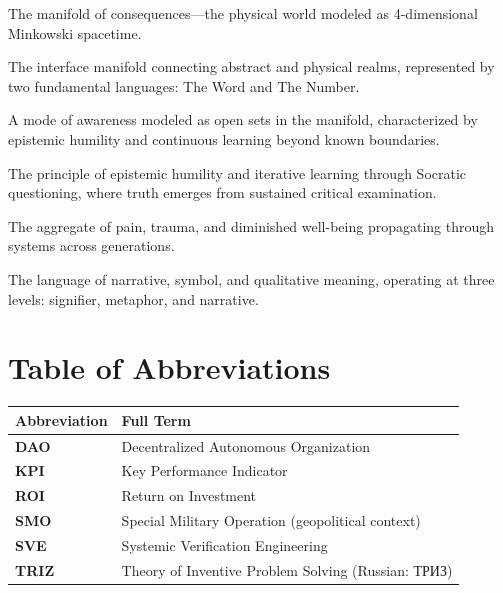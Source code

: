 \documentclass[11pt,a4paper]{article}
\begin{document}
\begin{description}[style=nextline, leftmargin=0pt, labelindent=0pt, font=\normalfont\bfseries]
    \item[$\Omega$ (Omega Manifold)] The manifold of consequences—the physical world modeled as 4-dimensional Minkowski spacetime.
    
    \item[$\pi\text{-}\pi$ (Psyche Interface)] The interface manifold connecting abstract and physical realms, represented by two fundamental languages: The Word and The Number.
    
    \item[Socratic Consciousness] A mode of awareness modeled as open sets in the manifold, characterized by epistemic humility and continuous learning beyond known boundaries.
    
    \item[Socratic Tail] The principle of epistemic humility and iterative learning through Socratic questioning, where truth emerges from sustained critical examination.
    
    \item[Suffering (Operational Definition)] The aggregate of pain, trauma, and diminished well-being propagating through systems across generations.
    
    \item[The Word] The language of narrative, symbol, and qualitative meaning, operating at three levels: signifier, metaphor, and narrative.
\end{description}

\section*{Table of Abbreviations}

\begin{tabular}{@{}>{\bfseries}ll@{}}
\toprule
\normalfont\textbf{Abbreviation} & \textbf{Full Term} \\
\midrule
DAO & Decentralized Autonomous Organization \\
KPI & Key Performance Indicator \\
ROI & Return on Investment \\
SMO & Special Military Operation (geopolitical context) \\
SVE & Systemic Verification Engineering \\
TRIZ & Theory of Inventive Problem Solving (Russian: \foreignlanguage{russian}{ТРИЗ}) \\
\bottomrule
\end{tabular}
\end{document}
